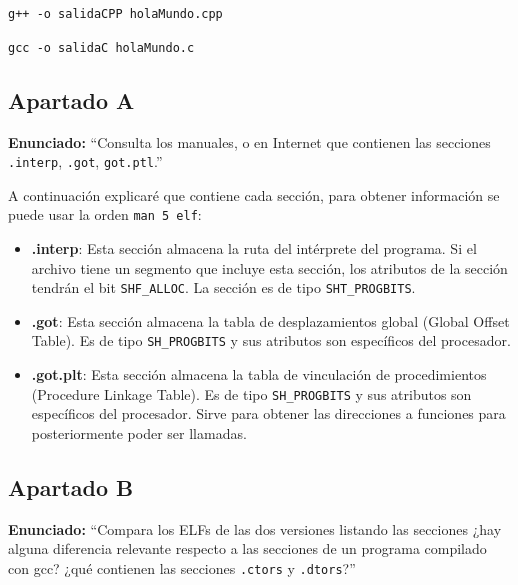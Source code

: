 \documentclass{article}
\begin{document}
\verb|g++ -o salidaCPP holaMundo.cpp|

\verb|gcc -o salidaC holaMundo.c|

\bigskip


{}
\subsection*{Apartado A}

\textbf{Enunciado: }``Consulta los manuales, o en Internet que contienen las secciones \texttt{.interp}, \texttt{.got}, \texttt{got.ptl}.''

\bigskip

A continuación explicaré que contiene cada sección, para obtener información se puede usar la orden \verb|man 5 elf|:

\begin{itemize}
    \item \textbf{.interp}: Esta sección almacena la ruta del intérprete del programa. Si el archivo tiene un segmento que incluye esta sección, los atributos de la sección tendrán el bit \texttt{SHF\_ALLOC}. La sección es de tipo \texttt{SHT\_PROGBITS}.
    
    \item \textbf{.got}: Esta sección almacena la tabla de desplazamientos global (Global Offset Table). Es de tipo \texttt{SH\_PROGBITS} y sus atributos son específicos del procesador. 
    
    \item \textbf{.got.plt}: Esta sección almacena la tabla de vinculación de procedimientos (Procedure Linkage Table). Es de tipo \texttt{SH\_PROGBITS} y sus atributos son específicos del procesador. Sirve para obtener las direcciones a funciones para posteriormente poder ser llamadas.
\end{itemize}

\newpage
{}
{}
\subsection*{Apartado B}

\textbf{Enunciado: }``Compara los ELFs de las dos versiones listando las secciones ¿hay alguna diferencia relevante respecto a las secciones de un programa compilado con gcc? ¿qué contienen las secciones \texttt{.ctors} y \texttt{.dtors}?''

\bigskip
\end{document}
